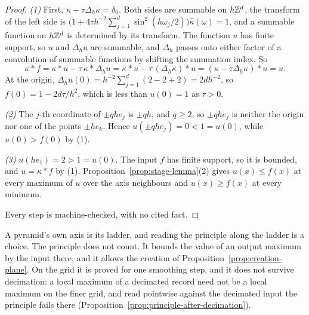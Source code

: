 \begin{proof}
\leanok
{}
\emph{(1)} First, $\kappa - \tau\Delta_h\kappa = \delta_0$. Both sides are summable on $h\mathbb{Z}^d$,
the transform of the left side is
$\bigl(1 + 4\tau h^{-2}\sum_{j=1}^d\sin^2(h\omega_j/2)\bigr)\widehat\kappa(\omega) = 1$, and a
summable function on $h\mathbb{Z}^d$ is determined by its transform. The function $u$ has finite support, so $u$ and
$\Delta_hu$ are summable, and $\Delta_h$ passes onto either factor of a convolution of summable
functions by shifting the summation index. So
\[
\kappa * f = \kappa * u - \tau\,\kappa * \Delta_hu = \kappa * u - \tau\,(\Delta_h\kappa) * u
= (\kappa - \tau\Delta_h\kappa) * u = u .
\]
At the origin, $\Delta_hu(0) = h^{-2}\sum_{j=1}^d(2 - 2 + 2) = 2dh^{-2}$, so
$f(0) = 1 - 2d\tau/h^2$, which is less than $u(0) = 1$ as $\tau > 0$.

\emph{(2)} The $j$-th coordinate of $\pm qhe_j$ is $\pm qh$, and $q \ge 2$, so $\pm qhe_j$ is neither
the origin nor one of the points $\pm he_k$. Hence $u(\pm qhe_j) = 0 < 1 = u(0)$, while
$u(0) > f(0)$ by (1).

\emph{(3)} $u(he_1) = 2 > 1 = u(0)$. The input $f$ has finite support, so it is bounded, and
$u = \kappa * f$ by (1). Proposition~\ref{prop:stage-lemma}(2) gives $u(x) \le f(x)$ at every
maximum of $u$ over the axis neighbours and $u(x) \ge f(x)$ at every minimum.

Every step is machine-checked, with no cited fact.
\end{proof}

A pyramid's own axis is its ladder, and reading the principle along the ladder is a choice. The
principle does not count. It bounds the
value of an output maximum by the input there, and it allows the creation of
Proposition~\ref{prop:creation-plane}. On the grid it is proved
for one smoothing step, and it does not survive decimation: a local maximum of a
decimated record need not be a local maximum on the finer grid, and read pointwise against the
decimated input the principle fails there (Proposition~\ref{prop:principle-after-decimation}).
